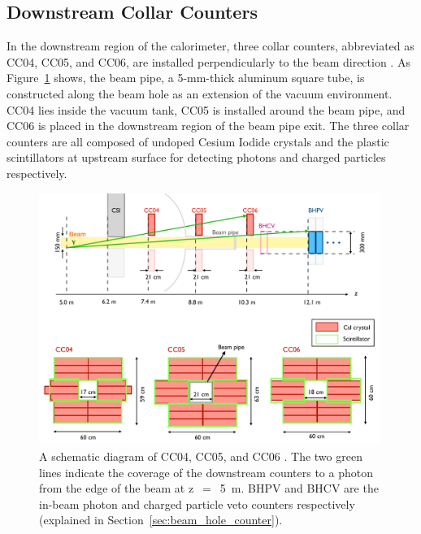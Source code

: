 
\subsection{Downstream Collar Counters}
In the downstream region of the calorimeter, three collar counters, abbreviated as CC04, CC05, and CC06, are installed perpendicularly to the beam direction \parencite{CC04_CC06}.  As Figure~\ref{fig:CC0X} shows, the beam pipe, a 5-mm-thick aluminum square tube, is constructed along the beam hole as an extension of the vacuum environment. CC04 lies inside the vacuum tank, CC05 is installed around the beam pipe, and CC06 is placed in the downstream region of the beam pipe exit. The three collar counters are all composed of undoped Cesium Iodide crystals and the plastic scintillators at upstream surface for detecting photons and charged particles respectively. 

\begin{figure}[H]
\begin{center}
\captionsetup{width=.99\linewidth}
\includegraphics[width=0.99\textwidth]{Figures/Chapter3/CC04_CC06.pdf}
\caption{A schematic diagram of CC04, CC05, and CC06 \parencite{CC04_CC06}. The two green lines indicate the coverage of the downstream counters to a photon from the edge of the beam at z~$=$~5~m. BHPV and BHCV are the in-beam photon and charged particle veto counters respectively (explained in Section~\ref{sec:beam_hole_counter}).} 
\label{fig:CC0X}
\end{center}
\end{figure}

